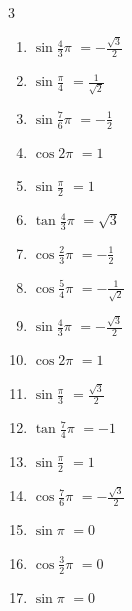\begin{multicols}{3}
\begin{enumerate}
  \item $\displaystyle \sin{\frac{4}{3}\pi}$
        $\displaystyle =-\frac{\sqrt{3}}{2}$

  \item $\displaystyle \sin{\frac{\pi}{4}}$
        $\displaystyle =\frac{1}{\sqrt{2}}$

  \item $\displaystyle \sin{\frac{7}{6}\pi}$
        $\displaystyle =-\frac{1}{2}$

  \item $\displaystyle \cos{2\pi}$
        $\displaystyle =1$

  \item $\displaystyle \sin{\frac{\pi}{2}}$
        $\displaystyle =1$

  \item $\displaystyle \tan{\frac{4}{3}\pi}$
        $\displaystyle =\sqrt{3}$

  \item $\displaystyle \cos{\frac{2}{3}\pi}$
        $\displaystyle =-\frac{1}{2}$

  \item $\displaystyle \cos{\frac{5}{4}\pi}$
        $\displaystyle =-\frac{1}{\sqrt{2}}$

  \item $\displaystyle \sin{\frac{4}{3}\pi}$
        $\displaystyle =-\frac{\sqrt{3}}{2}$

  \item $\displaystyle \cos{2\pi}$
        $\displaystyle =1$

  \item $\displaystyle \sin{\frac{\pi}{3}}$
        $\displaystyle =\frac{\sqrt{3}}{2}$

  \item $\displaystyle \tan{\frac{7}{4}\pi}$
        $\displaystyle =-1$

  \item $\displaystyle \sin{\frac{\pi}{2}}$
        $\displaystyle =1$

  \item $\displaystyle \cos{\frac{7}{6}\pi}$
        $\displaystyle =-\frac{\sqrt{3}}{2}$

  \item $\displaystyle \sin{\pi}$
        $\displaystyle =0$

  \item $\displaystyle \cos{\frac{3}{2}\pi}$
        $\displaystyle =0$

  \item $\displaystyle \sin{\pi}$
        $\displaystyle =0$


\end{enumerate}
\end{multicols}
